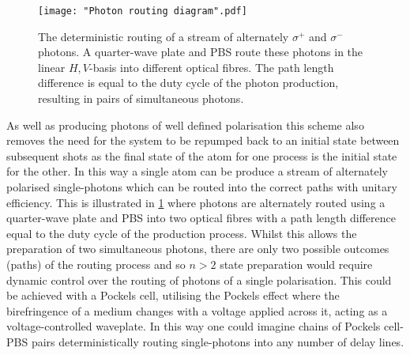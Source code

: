 \documentclass[../Thesis-IJspeert.tex]{subfiles}
\begin{document}
\begin{figure}[t] 
   \centering
   \texttt{[image: "Photon routing diagram".pdf]}
   \caption[Deterministic routing of a stream of polarised photons]{The deterministic routing of a stream of alternately $\sigma^+$ and $\sigma^-$ photons.  A quarter-wave plate and PBS route these photons in the linear ${H,V}$-basis into different optical fibres. The path length difference is equal to the duty cycle of the photon production, resulting in pairs of simultaneous photons.}
   \label{fig:PhotonRoutingDiagram}
\end{figure}

As well as producing photons of well defined polarisation this scheme also removes the need for the system to be repumped back to an initial state between subsequent shots as the final state of the atom for one process is the initial state for the other.  In this way a single atom can be produce a stream of alternately polarised single-photons which can be routed into the correct paths with unitary efficiency. This is illustrated in \cref{fig:PhotonRoutingDiagram} where photons are alternately routed using a quarter-wave plate and PBS into two optical fibres with a path length difference equal to the duty cycle of the production process.  Whilst this allows the preparation of two simultaneous photons, there are only two possible outcomes (paths) of the routing process and so $n>2$ state preparation would require dynamic control over the routing of photons of a single polarisation.  This could be achieved with a Pockels cell, utilising the Pockels effect where the birefringence of a medium changes with a voltage applied across it, acting as a voltage-controlled waveplate.  In this way one could imagine chains of Pockels cell-PBS pairs deterministically routing single-photons into any number of delay lines.

\fi
\end{document}
